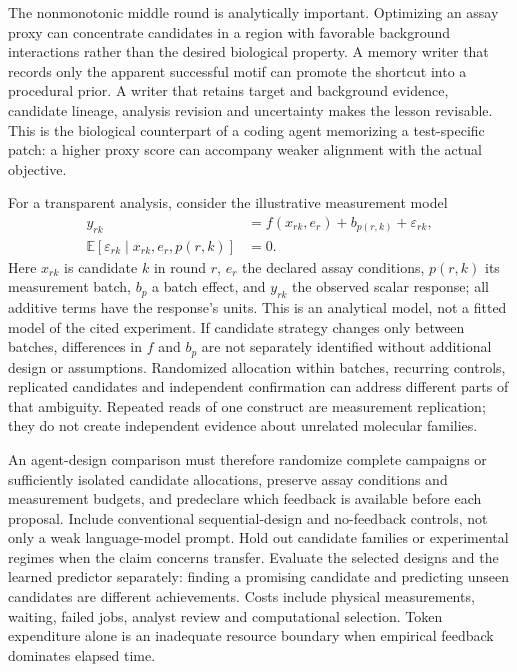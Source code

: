 The nonmonotonic middle round is analytically important. Optimizing an assay proxy can concentrate candidates in a region with favorable background interactions rather than the desired biological property. A memory writer that records only the apparent successful motif can promote the shortcut into a procedural prior. A writer that retains target and background evidence, candidate lineage, analysis revision and uncertainty makes the lesson revisable. This is the biological counterpart of a coding agent memorizing a test-specific patch: a higher proxy score can accompany weaker alignment with the actual objective.

For a transparent analysis, consider the illustrative measurement model
\begin{align}
 y_{rk}&=f(x_{rk},e_r)+b_{p(r,k)}+\varepsilon_{rk},\\
 \mathbb E[\varepsilon_{rk}\mid x_{rk},e_r,p(r,k)]&=0.
\end{align}
Here $x_{rk}$ is candidate $k$ in round $r$, $e_r$ the declared assay conditions, $p(r,k)$ its measurement batch, $b_p$ a batch effect, and $y_{rk}$ the observed scalar response; all additive terms have the response's units. This is an analytical model, not a fitted model of the cited experiment. If candidate strategy changes only between batches, differences in $f$ and $b_p$ are not separately identified without additional design or assumptions. Randomized allocation within batches, recurring controls, replicated candidates and independent confirmation can address different parts of that ambiguity. Repeated reads of one construct are measurement replication; they do not create independent evidence about unrelated molecular families.

An agent-design comparison must therefore randomize complete campaigns or sufficiently isolated candidate allocations, preserve assay conditions and measurement budgets, and predeclare which feedback is available before each proposal. Include conventional sequential-design and no-feedback controls, not only a weak language-model prompt. Hold out candidate families or experimental regimes when the claim concerns transfer. Evaluate the selected designs and the learned predictor separately: finding a promising candidate and predicting unseen candidates are different achievements. Costs include physical measurements, waiting, failed jobs, analyst review and computational selection. Token expenditure alone is an inadequate resource boundary when empirical feedback dominates elapsed time.

